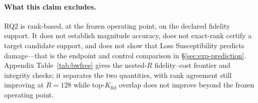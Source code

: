 \paragraph{What this claim excludes.}
RQ2 is rank-based, at the frozen operating point, on the declared fidelity
support. It does not establish magnitude accuracy, does not exact-rank
certify a target candidate support, and does not show that Loss
Susceptibility predicts damage---that is the endpoint and control comparison
in \S\ref{sec:exp-prediction}. Appendix Table~\ref{tab:bwfree} gives the
nested-$R$ fidelity--cost frontier and integrity checks; it separates the two
quantities, with rank agreement still improving at $R=128$ while
top-$K_{\mathrm{fid}}$ overlap does not improve beyond the frozen operating
point.


